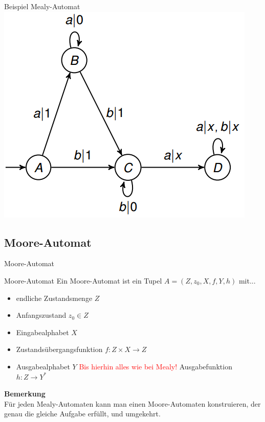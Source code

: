 \begin{frame}{Beispiel Mealy-Automat}
	\includegraphics[scale=0.6]{images/MealyBsp.png}
\end{frame}


\subsection{Moore-Automat}

\begin{frame}{Moore-Automat}
	\pause
	\begin{block}{Moore-Automat}
		Ein Moore-Automat ist ein Tupel $A = (Z, z_0, X, f, Y, h)$ mit...
		\begin{itemize}
			\item endliche Zustandsmenge $Z$
			\item Anfangszustand $z_0 \in Z$
			\item Eingabealphabet $X$
			\item Zustandsübergangsfunktion $f: Z \times X \rightarrow Z$
			\item Ausgabealphabet $Y$
			\pitem[$\rightarrow$] \textcolor{red}{Bis hierhin alles wie bei Mealy!}
			\pitem Ausgabefunktion $h: Z \rightarrow Y^*$
		\end{itemize}
	\end{block}

	\pause
	
	\textbf{Bemerkung}\\
	Für jeden Mealy-Automaten kann man einen Moore-Automaten konstruieren, der genau die gleiche Aufgabe erfüllt, und umgekehrt.
\end{frame}

